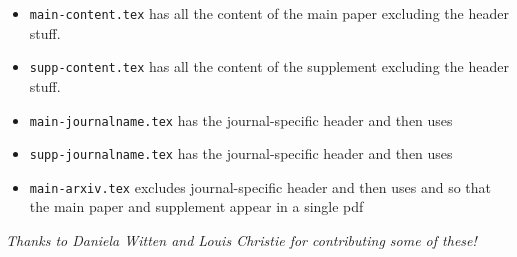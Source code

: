 \documentclass[11pt]{article}
\begin{document}
\begin{todolist}
    \begin{itemize}
    \item {\tt main-content.tex} has all the content of the main
      paper excluding the header stuff.
    \item {\tt supp-content.tex} has all the content of the supplement excluding the header stuff.
\item  {\tt main-journalname.tex} has the journal-specific header and then uses \verb++
\item  {\tt supp-journalname.tex} has the journal-specific header and then uses \verb++
\item  {\tt main-arxiv.tex} excludes journal-specific header and then uses \verb++ and \verb++ so that the main paper and supplement appear in a single pdf
    \end{itemize}
 
\end{todolist}

{\em Thanks to Daniela Witten and Louis Christie for contributing some of these!}
\end{document}
